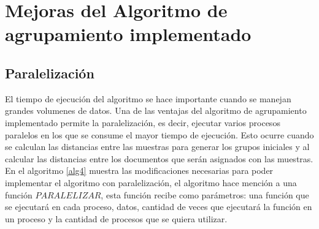 \newpage

\section{Mejoras del Algoritmo de agrupamiento implementado}\label{mejoras123}

\subsection{Paralelización}

El tiempo de ejecución del algoritmo se hace importante cuando se manejan grandes volumenes de datos. Una de las ventajas del algoritmo de agrupamiento implementado permite la paralelización, es decir, ejecutar varios procesos paralelos en los que se consume el mayor tiempo de ejecución. Esto ocurre cuando se calculan las distancias entre las muestras para generar los grupos iniciales y al calcular las distancias entre los documentos que serán asignados con las muestras. En el algoritmo \ref{alg4} muestra las modificaciones necesarias para poder implementar el algoritmo con paralelización, el algoritmo hace mención a una función $PARALELIZAR$, esta función recibe como parámetros: una función que se ejecutará en cada proceso, datos, cantidad de veces que ejecutará la función en un proceso y la cantidad de procesos que se quiera utilizar. 

